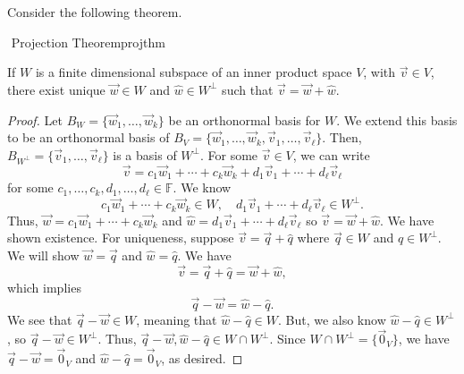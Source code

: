         \pagebreak
        \vphantom
        \\
        \\
        Consider the following theorem.
        \begin{theorem}{\Stop\,\,Projection Theorem}{projthm}

            If \(W\) is a finite dimensional subspace of an inner product space \(V\), with \(\vec{v}\in V\), there exist unique \(\vec{w}\in W\) and \(\hat{w}\in W^\perp\) such that \(\vec{v}=\vec{w}+\hat{w}\).
            \begin{proof}
                Let \(B_W=\{\vec{w}_1,\ldots,\vec{w}_k\}\) be an orthonormal basis for \(W\). We extend this basis to be an orthonormal basis of \(B_V=\{\vec{w}_1,\ldots,\vec{w}_k,\vec{v}_1,\ldots,\vec{v}_\ell\}\). Then, \(B_{W^\perp}=\{\vec{v}_1,\ldots,\vec{v}_\ell\}\) is a basis of \(W^\perp\). For some \(\vec{v}\in V\), we can write
                \begin{equation*}
                    \vec{v}=c_1\vec{w}_1+\cdots+c_k\vec{w}_k+d_1\vec{v}_1+\cdots+d_\ell\vec{v}_\ell
                \end{equation*}
                for some \(c_1,\ldots,c_k,d_1,\ldots,d_\ell\in\mathbb{F}\). We know
                \begin{equation*}
                    c_1\vec{w}_1+\cdots+c_k\vec{w}_k\in W,\quad d_1\vec{v}_1+\cdots+d_\ell\vec{v}_\ell\in W^\perp.
                \end{equation*}
                Thus, \(\vec{w}=c_1\vec{w}_1+\cdots+c_k\vec{w}_k\) and \(\hat{w}=d_1\vec{v}_1+\cdots+d_\ell\vec{v}_\ell\) so \(\vec{v}=\vec{w}+\hat{w}\). We have shown existence. For uniqueness, suppose \(\vec{v}=\vec{q}+\hat{q}\) where \(\vec{q}\in W\) and \(\hat{q}\in W^\perp\). We will show \(\vec{w}=\vec{q}\) and \(\hat{w}=\hat{q}\). We have
                \begin{equation*}
                    \vec{v}=\vec{q}+\hat{q}=\vec{w}+\hat{w},
                \end{equation*}
                which implies
                \begin{equation*}
                    \vec{q}-\vec{w}=\hat{w}-\hat{q}.
                \end{equation*}
                We see that \(\vec{q}-\vec{w}\in W\), meaning that \(\hat{w}-\hat{q}\in W\). But, we also know \(\hat{w}-\hat{q}\in W^\perp\), so \(\vec{q}-\vec{w}\in W^\perp\). Thus, \(\vec{q}-\vec{w},\hat{w}-\hat{q}\in W\cap W^\perp\). Since \(W\cap W^\perp=\{\vec{0}_V\}\), we have \(\vec{q}-\vec{w}=\vec{0}_V\) and \(\hat{w}-\hat{q}=\vec{0}_V\), as desired.
            \end{proof}
            
        \end{theorem}

